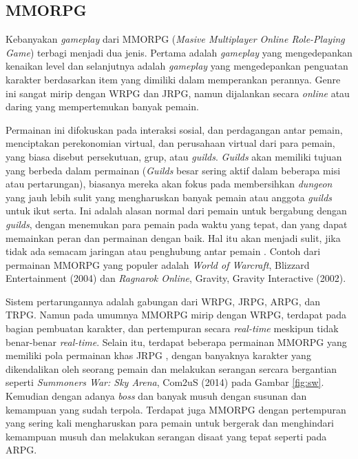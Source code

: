 \begin{subs}
	\subsection{MMORPG}
	\label{sec:sub_sec2_mmorpg}
	
	Kebanyakan \textit{gameplay} dari MMORPG (\textit{Masive Multiplayer Online Role-Playing Game}) terbagi menjadi dua jenis. Pertama adalah \textit{gameplay} yang mengedepankan kenaikan level dan selanjutnya adalah \textit{gameplay} yang mengedepankan penguatan karakter berdasarkan item yang dimiliki dalam memperankan perannya. Genre ini sangat mirip dengan WRPG dan JRPG, namun dijalankan secara \textit{online} atau daring yang mempertemukan banyak pemain.
	\vspace{1ex}
	
	Permainan ini difokuskan pada interaksi sosial, dan perdagangan antar pemain, menciptakan perekonomian virtual, dan perusahaan virtual dari para pemain, yang biasa disebut persekutuan, grup, atau \textit{guilds}. \textit{Guilds} akan memiliki tujuan yang berbeda dalam permainan (\textit{Guilds} besar sering aktif dalam beberapa misi atau pertarungan), biasanya mereka akan fokus pada membersihkan \textit{dungeon} yang jauh lebih sulit yang mengharuskan banyak pemain atau anggota \textit{guilds} untuk ikut serta. Ini adalah alasan normal dari pemain untuk bergabung dengan \textit{guilds}, dengan menemukan para pemain pada waktu yang tepat, dan yang dapat memainkan peran dan permainan dengan baik. Hal itu akan menjadi sulit, jika tidak ada semacam jaringan atau penghubung antar pemain \citep{yeenick2020}. Contoh dari permainan MMORPG yang populer adalah \textit{World of Warcraft}, Blizzard Entertainment (2004) dan \textit{Ragnarok Online}, Gravity, Gravity Interactive (2002). 
	\vspace{1ex}
	
	Sistem pertarungannya adalah gabungan dari WRPG, JRPG, ARPG, dan TRPG. Namun pada umumnya MMORPG mirip dengan WRPG, terdapat pada bagian pembuatan karakter, dan pertempuran secara \textit{real-time} meskipun tidak benar-benar \textit{real-time}. Selain itu, terdapat beberapa permainan MMORPG yang memiliki pola permainan khas JRPG \citep{moore2016}, dengan banyaknya karakter yang dikendalikan oleh seorang pemain dan melakukan serangan sercara bergantian seperti \textit{Summoners War: Sky Arena}, Com2uS (2014) pada Gambar \ref{fig:sw}. Kemudian dengan adanya \textit{boss} dan banyak musuh dengan susunan dan kemampuan yang sudah terpola. Terdapat juga MMORPG dengan pertempuran yang sering kali mengharuskan para pemain untuk bergerak dan menghindari kemampuan musuh dan melakukan serangan disaat yang tepat seperti pada ARPG.
	\vspace{1ex}
	

\end{subs}

